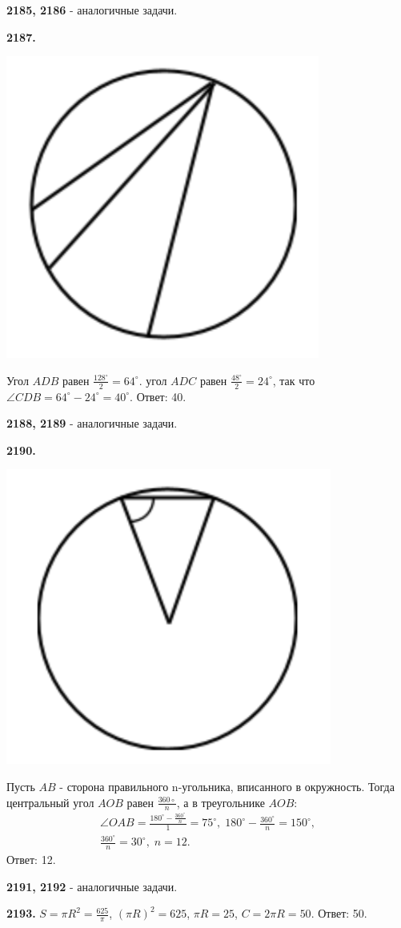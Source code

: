 \textbf{2185, 2186} - аналогичные задачи.

\textbf{2187.}

{\centering \includegraphics[width=0.35\linewidth]{Geometry/Content/49.png}
	
}

 Угол $ADB$ равен $\frac{128^\circ}{2}=64^\circ$. угол $ADC$ равен $\frac{48^\circ}{2}=24^\circ$, так что $\angle CDB = 64^\circ - 24^\circ=40^\circ.$ \newline \null \hspace*{\fill} Ответ: 40.

\textbf{2188, 2189} - аналогичные задачи.

\textbf{2190.}

{\centering \includegraphics[width=0.35\linewidth]{Geometry/Content/50.png}
	
}

Пусть $AB$ - сторона правильного n-угольника, вписанного в \newline окружность. Тогда центральный угол $AOB$ равен $\frac{360\circ}{n}$, а в треугольнике $AOB$:
\begin{gather*}
	\angle OAB = \frac{180^\circ-\frac{360^\circ}{n}}{1}=75^\circ, \; 180^\circ-\frac{360^\circ}{n}=150^\circ, \\ \frac{360^\circ}{n}=30^\circ,\;  n =12.
\end{gather*} \null \hspace*{\fill} Ответ: 12.

\textbf{2191, 2192} - аналогичные задачи.

\textbf{2193.} $S=\pi R^2= \frac{625}{\pi}$, $(\pi R)^2 = 625$, $\pi R = 25$, $C = 2\pi R = 50.$ \newline \null \hspace*{\fill} Ответ: 50.

